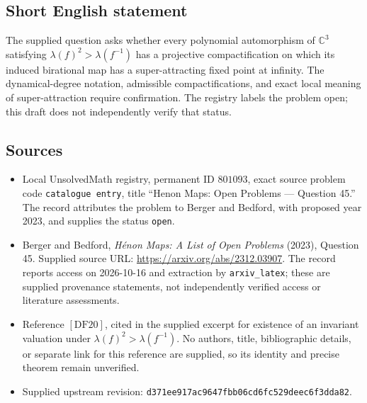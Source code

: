 \documentclass[11pt]{article}
\newcommand{\C}{\mathbb{C}}
\begin{document}
\subsection{Short English statement}
The supplied question asks whether every polynomial automorphism of \(\C^3\) satisfying \(\lambda(f)^2>\lambda(f^{-1})\) has a projective compactification on which its induced birational map has a super-attracting fixed point at infinity. The dynamical-degree notation, admissible compactifications, and exact local meaning of super-attraction require confirmation. The registry labels the problem open; this draft does not independently verify that status.
\subsection{Sources}
\begin{itemize}
\item Local UnsolvedMath registry, permanent ID \(801093\), exact source problem code \texttt{catalogue entry}, title ``Henon Maps: Open Problems --- Question 45.'' The record attributes the problem to Berger and Bedford, with proposed year 2023, and supplies the status \texttt{open}.
\item Berger and Bedford, \emph{H\'enon Maps: A List of Open Problems} (2023), Question 45. Supplied source URL: \url{https://arxiv.org/abs/2312.03907}. The record reports access on 2026-10-16 and extraction by \texttt{arxiv\_latex}; these are supplied provenance statements, not independently verified access or literature assessments.
\item Reference \([\mathrm{DF20}]\), cited in the supplied excerpt for existence of an invariant valuation under \(\lambda(f)^2>\lambda(f^{-1})\). No authors, title, bibliographic details, or separate link for this reference are supplied, so its identity and precise theorem remain unverified.
\item Supplied upstream revision: \texttt{d371ee917ac9647fbb06cd6fc529deec6f3dda82}.
\end{itemize}
\end{document}
